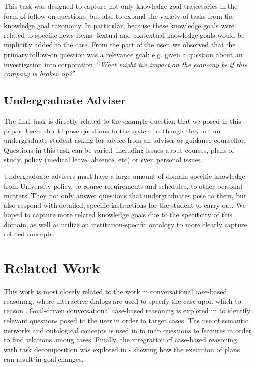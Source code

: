 \documentclass[11pt,letterpaper]{article}
\begin{document}
This task was designed to capture not only knowledge goal trajectories in the form of follow-on questions, but also to expand the variety of tasks from the knowledge goal taxonomy. In particular, because these knowledge goals were related to specific news items; textual and contextual knowledge goals would be implicitly added to the case. From the part of the user, we observed that the primary follow-on question was a relevance goal; e.g. given a question about an investigation into corporation, ``\textit{What might the impact on the economy be if this company is broken up?}''

\subsection{Undergraduate Adviser}

The final task is directly related to the example question that we posed in this paper. Users should pose questions to the system as though they are an undergraduate student asking for advice from an adviser or guidance counsellor. Questions in this task can be varied, including issues about courses, plans of study, policy (medical leave, absence, etc) or even personal issues.

Undergraduate advisers must have a large amount of domain specific knowledge from University policy, to course requirements and schedules, to other personal matters. They not only answer questions that undergraduates pose to them, but also respond with detailed, specific instructions for the student to carry out. We hoped to capture more related knowledge goals due to the specificity of this domain, as well as utilize an institution-specific ontology to more clearly capture related concepts.

\section{Related Work}

This work is most closely related to the work in conversational case-based reasoning, where interactive dialogs are used to specify the case upon which to reason \cite{aha_advances_2005}. Goal-driven conversational case-based reasoning is explored in \cite{mcsherry_conversational_2005} to identify relevant questions posed to the user in order to target cases. The use of semantic networks and ontological concepts is used in \cite{gu_knowledge-intensive_2005} to map questions to features in order to find relations among cases. Finally, the integration of case-based reasoning with task decomposition was explored in \cite{munoz-avila_sin:_2001} - showing how the execution of plans can result in goal changes.
\end{document}
